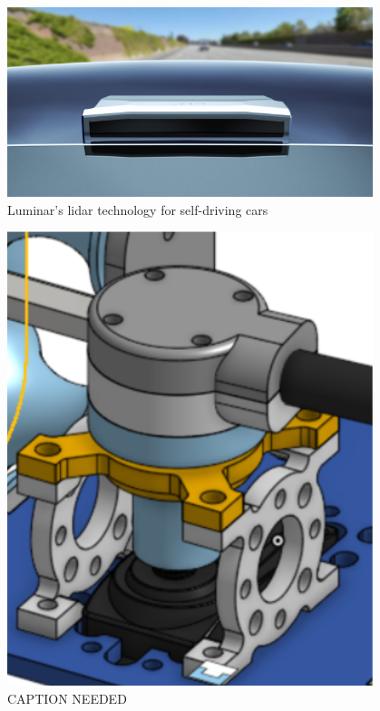  
\begin{figure}[htp]
\centering
\includegraphics[width=0.95\textwidth, angle=0]{Meetings/February/02-07-23/luminar-iris-roof-mounted-lidar_100767931_m.jpg}
\caption{Luminar's lidar technology for self-driving cars}
\label{fig:pic1}
\end{figure}

\begin{figure}[htp]
\centering
\includegraphics[width=0.95\textwidth, angle=0]{Meetings/February/02-07-23/2-7-23_CAD.PNG}
\caption{CAPTION NEEDED}
\label{fig:pic2}
\end{figure}


